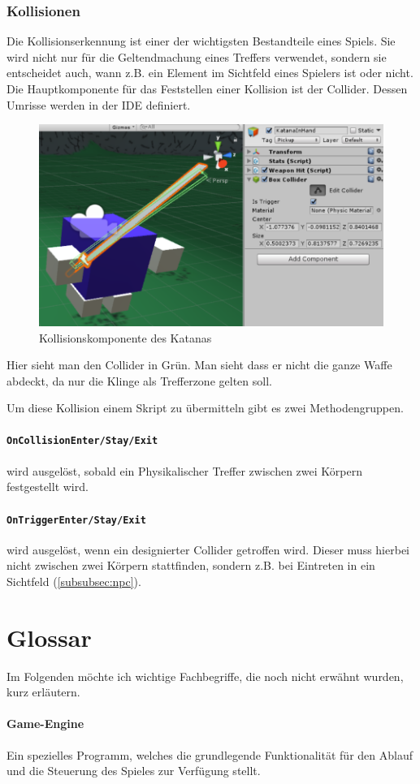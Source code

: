\subsubsection{Kollisionen}
\label{subsubsec:collider}
Die Kollisionserkennung ist einer der wichtigsten Bestandteile eines Spiels. Sie wird nicht nur für die Geltendmachung eines Treffers verwendet, sondern sie entscheidet auch, wann z.B. ein Element im Sichtfeld eines Spielers ist oder nicht.
Die Hauptkomponente für das Feststellen einer Kollision ist der Collider.
Dessen Umrisse werden in der IDE definiert.
\begin{figure}[H]
\includegraphics[scale=0.8]{screenshots/katanacollider.png}
\caption{Kollisionskomponente des Katanas}
\end{figure}
Hier sieht man den Collider in Grün. Man sieht dass er nicht die ganze Waffe abdeckt, da nur die Klinge als Trefferzone gelten soll.

Um diese Kollision einem Skript zu übermitteln gibt es zwei Methodengruppen.
\paragraph{\lstinline{OnCollisionEnter/Stay/Exit}} wird ausgelöst, sobald ein Physikalischer Treffer zwischen zwei Körpern festgestellt wird.
\paragraph{\lstinline{OnTriggerEnter/Stay/Exit}} wird ausgelöst, wenn ein designierter Collider getroffen wird. Dieser muss hierbei nicht zwischen zwei Körpern stattfinden, sondern z.B. bei Eintreten in ein Sichtfeld (\cref{subsubsec:npc}).

\section{Glossar}

Im Folgenden möchte ich wichtige Fachbegriffe, die noch nicht erwähnt wurden, kurz erläutern. 

\paragraph{Game-Engine}
Ein spezielles Programm, welches die grundlegende Funktionalität für den Ablauf und die Steuerung des Spieles zur Verfügung stellt.




